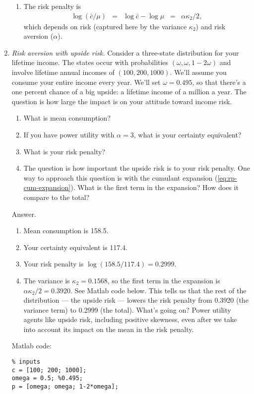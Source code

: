 \documentclass[11pt]{article}
\begin{document}
\begin{enumerate}
\begin{enumerate}
\item The risk penalty is
\begin{eqnarray*}
    \log (\bar{c}/\mu) &=& \log \bar{c} - \log \mu \;\;=\;\; \alpha\kappa_2/2 ,
\end{eqnarray*}
which depends on risk (captured here by the variance $\kappa_2$)
and risk aversion ($\alpha$).
\end{enumerate}


\item {\it Risk aversion with upside risk.\/}
Consider a three-state distribution for your lifetime income.
The states occur with probabilities $(\omega, \omega, 1-2\omega)$
and involve lifetime annual incomes of $(100, 200, 1000)$.
We'll assume you consume your entire income every year.
We'll set $\omega = 0.495$, so that there's a one percent chance
of a big upside:  a lifetime income of a million a year.
The question is how large the impact is on your attitude toward income risk.
%
\begin{enumerate}
\item What is mean consumption?
\item If you have power utility with $\alpha = 3$, what is your certainty equivalent?
\item What is your risk penalty?
\item The question is how important the upside risk is to your risk penalty.
One way to approach this question is with the cumulant expansion
(\ref{eq:rp-cum-expansion}).
What is the first term in the expansion?
How does it compare to the total?
\end{enumerate}
%
Answer.
\begin{enumerate}
\item Mean consumption is 158.5.
\item Your certainty equivalent is 117.4.
\item Your risk penalty is $ \log (158.5/117.4) = 0.2999$.
\item The variance is $\kappa_2 = 0.1568$, so the first term
in the expansion is $\alpha \kappa_2 / 2 = 0.3920$.
See Matlab code below.
This tells us that the rest of the distribution --- the upside risk ---
lowers the risk penalty from 0.3920 (the variance term) to 0.2999 (the total).
What's going on?
Power utility agents like upside risk, including positive skewness,
even after we take into account its impact on the mean in the risk penalty.
\end{enumerate}

Matlab code:
\begin{verbatim}
% inputs
c = [100; 200; 1000];
omega = 0.5; %0.495;
p = [omega; omega; 1-2*omega];


\end{verbatim}
\end{enumerate}
\end{document}
